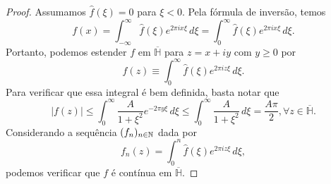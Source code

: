         \begin{proof}
            Assumamos $\widehat{f}(\xi) = 0$ para $\xi < 0$.
            Pela fórmula de inversão, temos
            \begin{equation*}
                f(x) = \int_{-\infty}^{\infty} 
                \widehat{f}(\xi)e^{2\pi ix\xi} \, d\xi =
                \int_{0}^{\infty} 
                \widehat{f}(\xi)e^{2\pi ix\xi} \, d\xi.
            \end{equation*}
            Portanto, podemos estender $f$ em $\overline{\mathbb{H}}$ para 
            $z = x+iy$ com $y\geq 0$ por
            \begin{equation*}
                f(z) \equiv \int_{0}^{\infty} 
                \widehat{f}(\xi)e^{2\pi iz\xi} \, d\xi.
            \end{equation*}
            Para verificar que essa integral é bem definida, basta
            notar que
            \begin{equation*}
                |f(z)| \leq \int_{0}^{\infty} 
                \frac{A}{1+ \xi^2}e^{-2\pi y\xi} \, d\xi
                \leq \int_{0}^{\infty} 
                \frac{A}{1+ \xi^2} \, d\xi
                = \frac{A\pi}{2}, 
                \forall z\in\overline{\mathbb{H}}.
            \end{equation*}
            Considerando a sequência $(f_n)_{n\in\mathbb{N}}$ dada por
            \begin{equation*}
                f_n(z) = \int_0^n \widehat{f}(\xi)e^{2\pi iz\xi} \, d\xi,
            \end{equation*}
            podemos verificar que $f$ é contínua em 
            $\overline{\mathbb{H}}$.
            

\end{proof}
